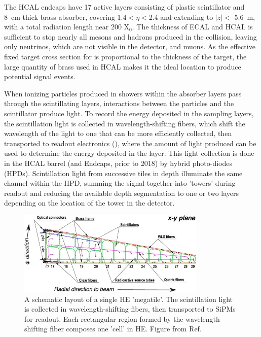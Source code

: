 The HCAL endcaps have 17 active layers consisting of plastic scintillator and \SI{8}{\centi\meter} thick brass absorber, covering 1.4$<\eta<$2.4 and extending to $\lvert z \rvert<$ \SI{5.6}{\meter}, with a total radiation length near 200 X$_0$. 
The thickness of ECAL and HCAL is sufficient to stop nearly all mesons and hadrons produced in the collision, leaving only neutrinos, which are not visible in the detector, and muons. 
As the effective fixed target cross section for \dbrem is proportional to the thickness of the target, the large quantity of brass used in HCAL makes it the ideal location to produce potential signal events.

When ionizing particles produced in showers within the absorber layers pass through the scintillating layers, interactions between the particles and the scintillator produce light.
To record the energy deposited in the sampling layers, the scintillation light is collected in wavelength-shifting fibers, which shift the wavelength of the light to one that can be more efficiently collected, then transported to readout electronics (), where the amount of light produced can be used to determine the energy deposited in the layer.
This light collection is done in the HCAL barrel (and Endcaps, prior to 2018) by hybrid photo-diodes (HPDs). 
Scintillation light from successive tiles in depth illuminate the same channel within the HPD, summing the signal together into 'towers' during readout and reducing the available depth segmentation to one or two layers depending on the location of the tower in the detector.

\begin{figure}[!htpb]
	   \centering
	      \includegraphics[width=0.8\textwidth]{figures/megatile.jpg}
		 \caption[An HCAL Tile]{A schematic layout of a single HE 'megatile'. The scintillation light is collected in wavelength-shifting fibers, then transported to SiPMs for readout. Each rectangular region formed by the wavelength-shifting fiber composes one 'cell' in HE. Figure from Ref.\cite{sipmRadDam}}
	    \label{fig:megatile}
\end{figure}

